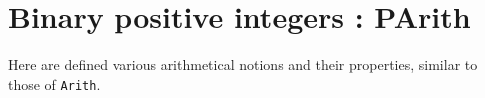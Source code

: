 \section{Binary positive integers : PArith}\label{PArith}

Here are defined various arithmetical notions and their properties,
similar to those of {\tt Arith}.
